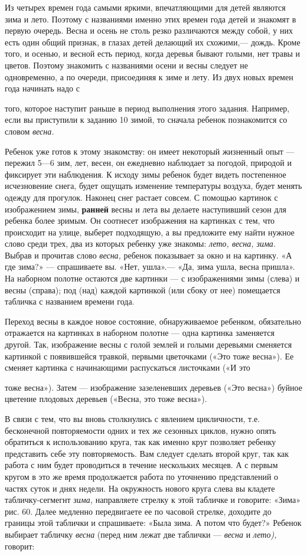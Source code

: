 \documentclass[a5paper]{book}
\renewcommand{\emph}[1]{\textit{#1}}
\begin{document}
Из четырех времен года самыми яркими, впечатляющими для детей являются
зима и лето. Поэтому с названиями именно этих времен года детей и
знакомят в первую очередь. Весна и осень не столь резко различаются
между собой, у них есть один общий признак, в глазах детей делающий их
схожими,--- дождь. Кроме того, и осенью, и весной есть период, когда
деревья бывают голыми, нет травы и цветов. Поэтому знакомить с
названиями осени и весны следует не одновременно, а по очереди,
присоединяя к зиме и лету. Из двух новых времен года начинать надо с

того, которое наступит раньше в период выполнения этого задания.
Например, если вы приступили к заданию 10 зимой, то сначала ребенок
познакомится со словом \emph{весна.}

Ребенок уже готов к этому знакомству: он имеет некоторый жизненный опыт
--- пережил 5---6 зим, лет, весен, он ежедневно наблюдает за погодой,
природой и фиксирует эти наблюдения. К исходу зимы ребенок будет видеть
постепенное исчезновение снега, будет ощущать изменение температуры
воздуха, будет менять одежду для прогулок. Наконец снег растает совсем.
С помощью картинок с изображением зимы, \textbf{ранней} весны и лета вы
делаете наступивший сезон для ребенка более зримым. Он соотнесет
изображения на картинках с тем, что происходит на улице, выберет
подходящую, а вы предложите ему найти нужное слово среди трех, два из
которых ребенку уже знакомы: \emph{лето, весна, зима.} Выбрав и прочитав
слово \emph{весна,} ребенок показывает за окно и на картинку. «А где
зима?» --- спрашиваете вы. «Нет, ушла».--- «Да, зима ушла, весна
пришла». На наборном полотне остаются две картинки --- с изображениями
зимы (слева) и весны (справа); под (над) каждой картинкой (или сбоку от
нее) помещается табличка с названием времени года.

Переход весны в каждое новое состояние, обнаруживаемое ребенком,
обязательно отражается на картинках в наборном полотне --- одна картинка
заменяется другой. Так, изображение весны с голой землей и голыми
деревьями сменяется картинкой с появившейся травкой, первыми цветочками
(«Это тоже весна»). Ее сменяет картинка с начинающими распускаться
листочками («И это

тоже весна»). Затем --- изображение зазеленевших деревьев («Это весна»)
буйное цветение плодовых деревьев («Весна, это тоже весна»).


В связи с тем, что вы вновь столкнулись с явлением цикличности, т.е.
бесконечной повторяемости одних и тех же сезонных циклов, нужно опять
обратиться к использованию круга, так как именно круг позволяет ребенку
представить себе эту повторяемость. Вам следует сделать второй круг, так
как работа с ним будет проводиться в течение нескольких месяцев. А с
первым кругом в это же время продолжается работа по уточнению
представлений о частях суток и днях недели. На окружность нового круга
слева вы кладете табличку-сегмегнт \emph{зима,} направляете стрелку к
этой табличке и говорите: «Зима» рис. 60. Далее медленно передвигаете ее
по часовой стрелке, доходите до границы этой таблички и спрашиваете:
«Была зима. А потом что будет?» Ребенок выбирает табличку \emph{весна}
(перед ним лежат две таблички --- \emph{весна} и \emph{лето),} говорит:
\end{document}

